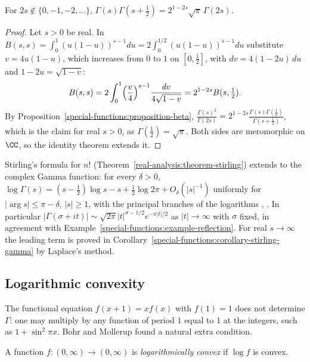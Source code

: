 \begin{proposition}\label{special-functions:proposition-duplication}
For $2s \notin \{0, -1, -2, \ldots\}$, $\Gamma(s)\Gamma(s + \frac12) = 2^{1 - 2s}\sqrt{\pi}\,\Gamma(2s)$.
\end{proposition}

\begin{proof}
Let $s > 0$ be real. In $B(s, s) = \int_0^1(u(1 - u))^{s-1}du = 2\int_0^{1/2}(u(1 - u))^{s-1}du$ substitute $v = 4u(1 - u)$, which increases from $0$ to $1$ on $[0, \frac12]$, with
$dv = 4(1 - 2u)\,du$ and $1 - 2u = \sqrt{1 - v}$:
\[
B(s, s) = 2\int_0^1\Bigl(\frac v4\Bigr)^{s-1}\frac{dv}{4\sqrt{1 - v}} = 2^{1 - 2s}B(s, \tfrac12).
\]
By Proposition~\ref{special-functions:proposition-beta}, $\frac{\Gamma(s)^2}{\Gamma(2s)} = 2^{1-2s}\frac{\Gamma(s)\Gamma(\frac12)}{\Gamma(s + \frac12)}$, which is the claim for real $s > 0$, as
$\Gamma(\frac12) = \sqrt{\pi}$. Both sides are meromorphic on $\CC$, so the identity theorem extends it.
\end{proof}

\begin{remark}\label{special-functions:remark-stirling-gamma}
Stirling's formula for $n!$ (Theorem~\ref{real-analysis:theorem-stirling}) extends to the complex Gamma function: for every $\delta > 0$,
$\log\Gamma(s) = (s - \frac12)\log s - s + \frac12\log 2\pi + O_\delta(|s|^{-1})$ uniformly for $|\arg s| \leq \pi - \delta$, $|s| \geq 1$, with the principal branches of the logarithms
\cite{iwaniec-kowalski}, \cite{titchmarsh-zeta}. In particular $|\Gamma(\sigma + it)| \sim \sqrt{2\pi}|t|^{\sigma - 1/2}e^{-\pi|t|/2}$ as $|t| \to \infty$ with $\sigma$ fixed, in agreement with
Example~\ref{special-functions:example-reflection}. For real $s \to \infty$ the leading term is proved in Corollary~\ref{special-functions:corollary-stirling-gamma} by Laplace's method.
\end{remark}

\subsection{Logarithmic convexity}\label{special-functions:subsection-log-convexity}

The functional equation $f(x + 1) = xf(x)$ with $f(1) = 1$ does not determine $\Gamma$: one may multiply by any function of period $1$ equal to $1$ at the integers, such as $1 + \sin^2\pi x$. Bohr and
Mollerup found a natural extra condition.

\begin{definition}\label{special-functions:definition-log-convex}
A function $f \colon (0, \infty) \to (0, \infty)$ is \emph{logarithmically convex} if $\log f$ is convex.
\end{definition}

